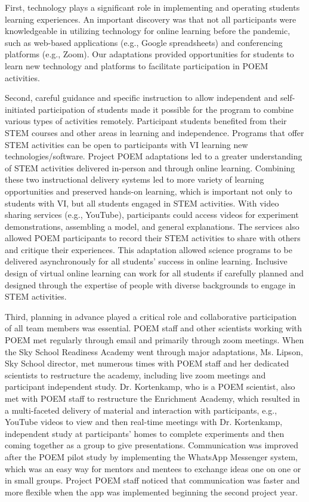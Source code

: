 \documentclass[11pt]{sig-alternate}
\begin{document}
\begin{large}
{First, technology plays a significant role in implementing and operating students learning experiences. An important discovery was that not all participants were knowledgeable in utilizing technology for online learning before the pandemic, such as web-based applications (e.g., Google spreadsheets) and conferencing platforms (e.g., Zoom). Our adaptations provided opportunities for students to learn new technology and platforms to facilitate participation in POEM activities. 

Second, careful guidance and specific instruction to allow independent and self-initiated participation of students made it possible for the program to combine various types of activities remotely. Participant students benefited from their STEM courses and other areas in learning and independence. Programs that offer STEM activities can be open to participants with VI learning new technologies/software. Project POEM adaptations led to a greater understanding of STEM activities delivered in-person and through online learning. Combining these two instructional delivery systems led to more variety of learning opportunities and preserved hands-on learning, which is important not only to students with VI, but all students engaged in STEM activities. With video sharing services (e.g., YouTube), participants could access videos for experiment demonstrations, assembling a model, and general explanations. The services also allowed POEM participants to record their STEM activities to share with others and critique their experiences. This adaptation allowed science programs to be delivered asynchronously for all students’ success in online learning. Inclusive design of virtual online learning can work for all students if carefully planned and designed through the expertise of people with diverse backgrounds to engage in STEM activities.

Third, planning in advance played a critical role and collaborative participation of all team members was essential. POEM staff and other scientists working with POEM met regularly through email and primarily through zoom meetings. When the Sky School Readiness Academy went through major adaptations, Ms. Lipson, Sky School director, met numerous times with POEM staff and her dedicated scientists to restructure the academy, including live zoom meetings and participant independent study. Dr. Kortenkamp, who is a POEM scientist, also met with POEM staff to restructure the Enrichment Academy, which resulted in a multi-faceted delivery of material and interaction with participants, e.g., YouTube videos to view and then real-time meetings with Dr. Kortenkamp, independent study at participants’ homes to complete experiments and then coming together as a group to give presentations. Communication was improved after the POEM pilot study by implementing the WhatsApp Messenger system, which was an easy way for mentors and mentees to exchange ideas one on one or in small groups. Project POEM staff noticed that communication was faster and more flexible when the app was implemented beginning the second project year.

}
\end{large}
\end{document}
